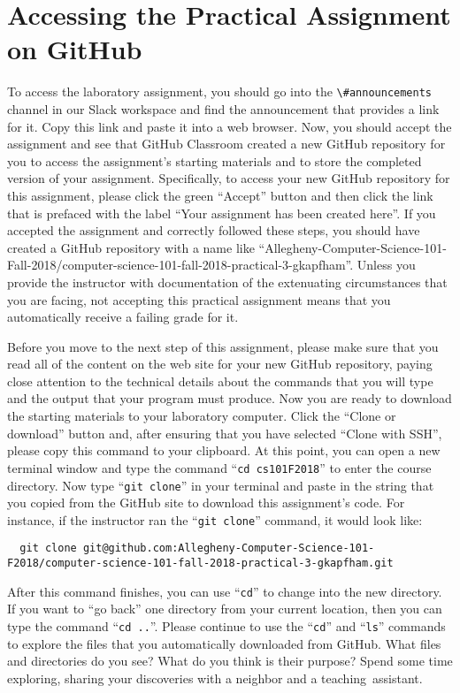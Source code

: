 \documentclass[11pt]{article}
\newcommand{\command}[1]{``\lstinline{#1}''}
\newcommand{\channel}[1]{\lstinline{#1}}
\newcommand{\step}[1]{``{#1}''}
\begin{document}
\section*{Accessing the Practical Assignment on GitHub}

To access the laboratory assignment, you should go into the
\channel{\#announcements} channel in our Slack workspace and find the announcement
that provides a link for it. Copy this link and paste it into a web browser.
Now, you should accept the assignment and see that GitHub Classroom created a
new GitHub repository for you to access the assignment's starting materials and
to store the completed version of your assignment. Specifically, to access your
new GitHub repository for this assignment, please click the green ``Accept''
button and then click the link that is prefaced with the label ``Your
assignment has been created here''. If you accepted the assignment and
correctly followed these steps, you should have created a GitHub repository
with a name like
``Allegheny-Computer-Science-101-Fall-2018/computer-science-101-fall-2018-practical-3-gkapfham''.
Unless you provide the instructor with documentation of the extenuating
circumstances that you are facing, not accepting this practical assignment
means that you automatically receive a failing grade for it.

Before you move to the next step of this assignment, please make sure that you
read all of the content on the web site for your new GitHub repository, paying
close attention to the technical details about the commands that you will type
and the output that your program must produce. Now you are ready to download the
starting materials to your laboratory computer. Click the ``Clone or download''
button and, after ensuring that you have selected ``Clone with SSH'', please
copy this command to your clipboard. At this point, you can open a new terminal
window and type the command \command{cd cs101F2018} to enter the course
directory. Now type \command{git clone} in your terminal and paste in the string
that you copied from the GitHub site to download this assignment's code. For
instance, if the instructor ran the \command{git clone} command, it would look
like:

\begin{lstlisting}
  git clone git@github.com:Allegheny-Computer-Science-101-F2018/computer-science-101-fall-2018-practical-3-gkapfham.git
\end{lstlisting}

After this command finishes, you can use \command{cd} to change into the new
directory. If you want to \step{go back} one directory from your current
location, then you can type the command \command{cd ..}. Please continue to use
the \command{cd} and \command{ls} commands to explore the files that you
automatically downloaded from GitHub. What files and directories do you see?
What do you think is their purpose? Spend some time exploring, sharing your
discoveries with a neighbor and a \mbox{teaching assistant}.
\end{document}

